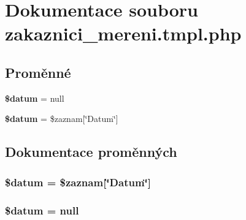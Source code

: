 \section{Dokumentace souboru zakaznici\_\-mereni.tmpl.php}
\label{zakaznici__mereni_8tmpl_8php}
\subsection*{Proměnné}
\begin{CompactItemize}
\item 
{\bf \$datum} = null
\item 
{\bf \$datum} = \$zaznam[\char`\"{}Datum\char`\"{}]
\end{CompactItemize}


\subsection{Dokumentace proměnných}
\subsubsection{\setlength{\rightskip}{0pt plus 5cm}\$datum = \$zaznam[\char`\"{}Datum\char`\"{}]}\label{zakaznici__mereni_8tmpl_8php_8577bf92daffc681075a34f87f9b8aca}


\subsubsection{\setlength{\rightskip}{0pt plus 5cm}\$datum = null}\label{zakaznici__mereni_8tmpl_8php_8577bf92daffc681075a34f87f9b8aca}


